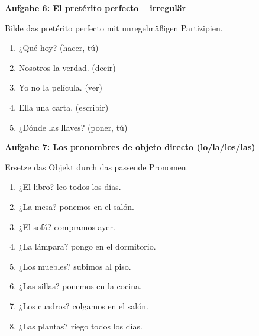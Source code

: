 \documentclass[a4paper,11pt]{article}
\newcommand{\luecke}[1]{\underline{\hspace{#1}}}
\newcommand{\punktebox}[1]{\hfill\fbox{\small\textcolor{mittelgrau}{\_\_\_\,/\,#1}}}
\newenvironment{aufgabe}[2]{%
    \vspace{3mm}
    \noindent\textbf{\color{spanisch}Aufgabe #1: #2}
    \vspace{1mm}
    \par
}{\vspace{2mm}}
\begin{document}
\begin{aufgabe}{6}{El pretérito perfecto -- irregulär \punktebox{5}}

Bilde das pretérito perfecto mit unregelmäßigen Partizipien.

\vspace{2mm}
\begin{enumerate}[itemsep=2mm]
    \item ¿Qué \luecke{3.5cm} hoy? (hacer, tú)
    \item Nosotros \luecke{3.5cm} la verdad. (decir)
    \item Yo no \luecke{3.5cm} la película. (ver)
    \item Ella \luecke{3.5cm} una carta. (escribir)
    \item ¿Dónde \luecke{3.5cm} las llaves? (poner, tú)
\end{enumerate}
\end{aufgabe}

\vspace{2mm}
\noindent{}


\begin{aufgabe}{7}{Los pronombres de objeto directo (lo/la/los/las) \punktebox{8}}

Ersetze das Objekt durch das passende Pronomen.

\vspace{2mm}
\begin{enumerate}[itemsep=2mm]
    \item ¿El libro? \luecke{1.5cm} leo todos los días.
    \item ¿La mesa? \luecke{1.5cm} ponemos en el salón.
    \item ¿El sofá? \luecke{1.5cm} compramos ayer.
    \item ¿La lámpara? \luecke{1.5cm} pongo en el dormitorio.
    \item ¿Los muebles? \luecke{1.5cm} subimos al piso.
    \item ¿Las sillas? \luecke{1.5cm} ponemos en la cocina.
    \item ¿Los cuadros? \luecke{1.5cm} colgamos en el salón.
    \item ¿Las plantas? \luecke{1.5cm} riego todos los días.
\end{enumerate}
\end{aufgabe}
\end{document}
